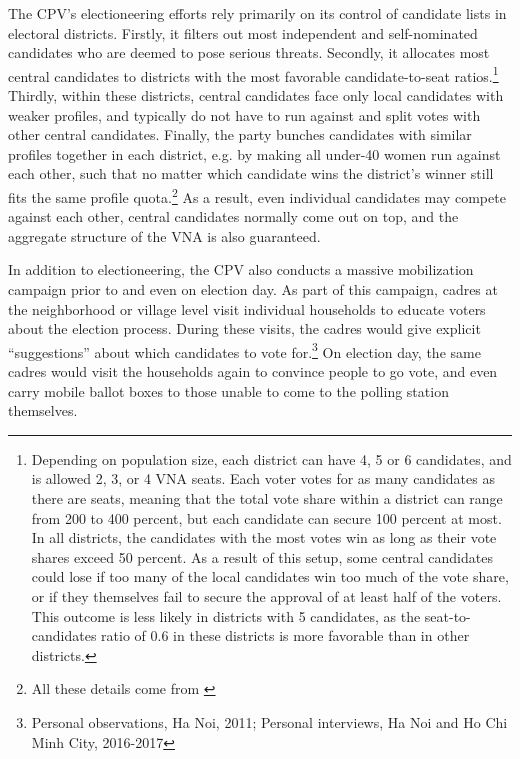 \documentclass[12pt]{article}
\newcommand{\1}{\mathbbm{1}}
\begin{document}
The CPV's electioneering efforts rely primarily on its control of candidate lists in electoral districts. Firstly, it filters out most independent and self-nominated candidates who are deemed to pose serious threats. Secondly, it allocates most central candidates to districts with the most favorable candidate-to-seat ratios.\footnote{Depending on population size, each district can have 4, 5 or 6 candidates, and is allowed 2, 3, or 4 VNA seats. Each voter votes for as many candidates as there are seats, meaning that the total vote share within a district can range from 200 to 400 percent, but each candidate can secure 100 percent at most. In all districts, the candidates with the most votes win as long as their vote shares exceed 50 percent. As a result of this setup, some central candidates could lose if too many of the local candidates win too much of the vote share, or if they themselves fail to secure the approval of at least half of the voters. This outcome is less likely in districts with 5 candidates, as the seat-to-candidates ratio of $0.6$ in these districts is more favorable than in other districts.} Thirdly, within these districts, central candidates face only local candidates with weaker profiles, and typically do not have to run against and split votes with other central candidates. Finally, the party bunches candidates with similar profiles together in each district, e.g. by making all under-40 women run against each other, such that no matter which candidate wins the district's winner still fits the same profile quota.\footnote{All these details come from \citet{MaleskySchuler2011}} As a result, even individual candidates may compete against each other, central candidates normally come out on top, and the aggregate structure of the VNA is also guaranteed. 

In addition to electioneering, the CPV also conducts a massive mobilization campaign prior to and even on election day. As part of this campaign, cadres at the neighborhood or village level visit individual households to educate voters about the election process. During these visits, the cadres would give explicit ``suggestions'' about which candidates to vote for.\footnote{Personal observations, Ha Noi, 2011; Personal interviews, Ha Noi and Ho Chi Minh City, 2016-2017} On election day, the same cadres would visit the households again to convince people to go vote, and even carry mobile ballot boxes to those unable to come to the polling station themselves.
\end{document}
